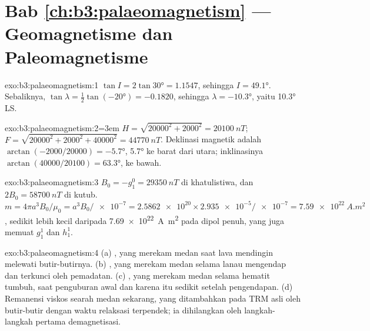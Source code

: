 \section*{Bab \ref{ch:b3:palaeomagnetism} --- Geomagnetisme dan Paleomagnetisme}

\begin{solution}{exo:b3:palaeomagnetism:1}
$\tan I = 2\tan\ang{30} = 1.1547$, sehingga $I = \ang{49.1}$. Sebaliknya, $\tan\lambda
= \tfrac12\tan(\ang{-20}) = -0.1820$, sehingga $\lambda = \ang{-10.3}$, yaitu
\ang{10.3}\,LS.
\end{solution}

\begin{solution}{exo:b3:palaeomagnetism:2}\begingroup\emergencystretch=3em\relax 
$H = \sqrt{20000^2 + 2000^2} = \qty{20100}{nT}$;
$F = \sqrt{20000^2 + 2000^2 + 40000^2} = \qty{44770}{nT}$. Deklinasi
magnetik adalah $\arctan(-2000/20000) = \ang{-5.7}$, \ang{5.7} ke barat dari utara;
inklinasinya $\arctan(40000/20100) = \ang{63.3}$, ke bawah.
\par\endgroup\end{solution}

\begin{solution}{exo:b3:palaeomagnetism:3}
$B_0 = -g_1^0 = \qty{29350}{nT}$ di khatulistiwa, dan $2B_0 = \qty{58700}{nT}$ di
kutub. $m = 4\pi a^3B_0/\mu_0 = a^3B_0/\num{e-7} = \num{2.5862e20}\times
\num{2.935e-5}/\num{e-7} = \qty{7.59e22}{A.m^2}$, sedikit lebih kecil daripada
\qty{7.69e22}{A.m^2} pada dipol penuh, yang juga memuat $g_1^1$ dan $h_1^1$.
\end{solution}

\begin{solution}{exo:b3:palaeomagnetism:4}
(a) , yang merekam medan saat lava mendingin
melewati  butir-butirnya. (b) ,
yang merekam medan selama lanau mengendap dan
terkunci oleh pemadatan. (c) , yang merekam medan
selama hematit tumbuh, saat penguburan awal dan karena itu sedikit
setelah pengendapan. (d) Remanensi viskos searah medan sekarang, yang ditambahkan pada
TRM asli oleh butir-butir dengan waktu relaksasi terpendek; ia dihilangkan oleh
langkah-langkah pertama demagnetisasi.
\end{solution}

